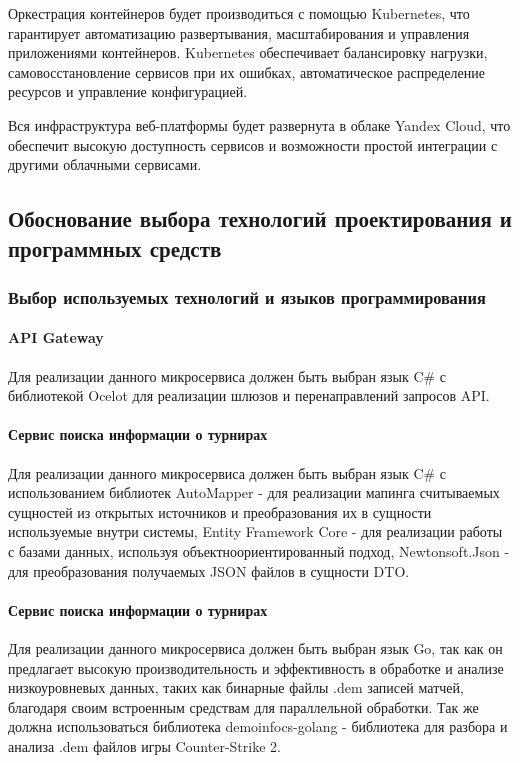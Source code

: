 Оркестрация контейнеров будет производиться с помощью Kubernetes, что гарантирует автоматизацию развертывания, масштабирования и управления приложениями контейнеров. Kubernetes обеспечивает балансировку нагрузки, самовосстановление сервисов при их ошибках, автоматическое распределение ресурсов и управление конфигурацией.

Вся инфраструктура веб-платформы будет развернута в облаке Yandex Cloud, что обеспечит высокую доступность сервисов и возможности простой интеграции с другими облачными сервисами.

\subsection{Обоснование выбора технологий проектирования и программных средств}
\subsubsection{Выбор используемых технологий и языков программирования}

\paragraph{API Gateway}

Для реализации данного микросервиса должен быть выбран язык C\# с библиотекой Ocelot для реализации шлюзов и перенаправлений запросов API.

\paragraph{Сервис поиска информации о турнирах}

Для реализации данного микросервиса должен быть выбран язык C\# с использованием библиотек AutoMapper - для реализации мапинга считываемых сущностей из открытых источников и преобразования их в сущности используемые внутри системы, Entity Framework Core - для реализации работы с базами данных, используя объектноориентированный подход, Newtonsoft.Json - для преобразования получаемых JSON файлов в сущности DTO.

\paragraph{Сервис поиска информации о турнирах}

Для реализации данного микросервиса должен быть выбран язык Go, так как он предлагает высокую производительность и эффективность в обработке и анализе низкоуровневых данных, таких как  бинарные файлы .dem записей матчей, благодаря своим встроенным средствам для параллельной обработки. Так же должна использоваться библиотека demoinfocs-golang - библиотека для разбора и анализа .dem файлов игры Counter-Strike 2.

